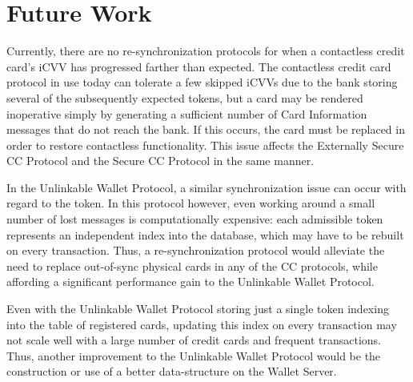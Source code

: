 \section{Future Work}

Currently, there are no re-synchronization protocols for when a contactless credit card's iCVV has progressed farther than expected.
The contactless credit card protocol in use today can tolerate a few skipped iCVVs due to the bank storing several of the subsequently expected tokens,
    but a card may be rendered inoperative simply by generating a sufficient number of Card Information messages that do not reach the bank.
If this occurs, the card must be replaced in order to restore contactless functionality.
This issue affects the Externally Secure CC Protocol and the Secure CC Protocol in the same manner.

In the Unlinkable Wallet Protocol, a similar synchronization issue can occur with regard to the token.
In this protocol however, even working around a small number of lost messages is computationally expensive:
    each admissible token represents an independent index into the database, which may have to be rebuilt on every transaction.
Thus, a re-synchronization protocol would alleviate the need to replace out-of-sync physical cards in any of the CC protocols,
    while affording a significant performance gain to the Unlinkable Wallet Protocol.

Even with the Unlinkable Wallet Protocol storing just a single token indexing into the table of registered cards,
    updating this index on every transaction may not scale well with a large number of credit cards and frequent transactions.
Thus, another improvement to the Unlinkable Wallet Protocol would be the construction or use of a better data-structure on the Wallet Server.
